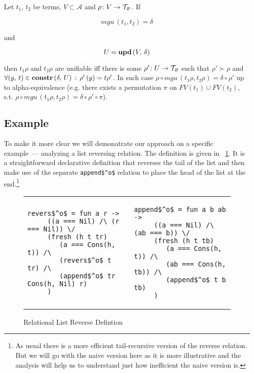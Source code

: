 \begin{lemma}

  Let $t_1$, $t_2$ be terms,  $V \subset \mathcal{A}$ and $\rho \colon V \to \mathcal{T}_{\varnothing}$. If

  \[ mgu\,(t_1, t_2) = \delta \]

  and

  \[ U = \mbox{\textbf{upd}}\,(V,\, \delta) \]

  then $t_1 \rho$ and $t_2 \rho$ are unifiable iff there is some $\rho' \colon U \to \mathcal{T}_{\varnothing}$ such that $\rho' \succ \rho$ and $\forall (y, \, t) \in \mbox{\textbf{constr}}\,(\delta,\, U)\,:\, \rho'\,(y) = t \rho'$.
In such case $ \rho \circ mgu\,(t_1 \rho, t_2 \rho) = \delta\circ\rho' $ up to alpha-equivalence (e.g. there exists a permutation $\pi$ on $FV(t_1) \cup FV(t_2)$, s.t. $ \rho \circ mgu\,(t_1 \rho, t_2 \rho) = \delta \circ\rho'\circ \pi$).
\end{lemma}

\subsection{Example}

To make it more clear we will demonatrate our approach on a specific example~--- analyzing a list reversing relation. The definition is given in \figureword~\ref{fig:reverso_definition}. It is a straightforward declarative definition that reverses the tail of the list and then make use of the separate \lstinline|append$^o$| relation to place the head of the list at the end.\footnote{As usual there is a more efficient tail-recursive version of the reverse relation. But we will go with the naive version here as it is more illustrative and the analysis will help us to understand just how inefficient the naive version is.}

\begin{figure}[t]
\begin{tabular}{p{6cm}p{6cm}}
\begin{lstlisting}[basicstyle=\small]
   revers$^o$ = fun a r ->
     ((a === Nil) /\ (r === Nil)) \/
     (fresh (h t tr)
        (a === Cons(h, t)) /\
        (revers$^o$ t tr) /\
        (append$^o$ tr Cons(h, Nil) r)
     )
\end{lstlisting} &
\begin{lstlisting}[basicstyle=\small]
   append$^o$ = fun a b ab ->
     ((a === Nil) /\ (ab === b)) \/
     (fresh (h t tb)
        (a === Cons(h, t)) /\
        (ab === Cons(h, tb)) /\
        (append$^o$ t b tb)
     )
\end{lstlisting}
\end{tabular}

\caption{Relational List Reverse Defintion}
\label{fig:reverso_definition}
\end{figure}

